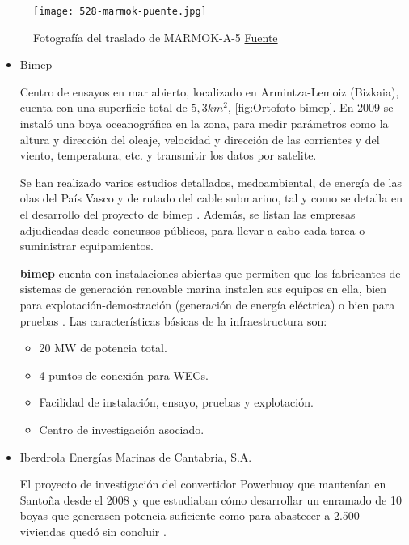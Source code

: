 \begin{figure}
\centering
\texttt{[image: 528-marmok-puente.jpg]}
\caption[Fotografía del traslado de MARMOK-A-5]{Fotografía del traslado de MARMOK-A-5 \href{https://www.tecnalia.com/es/energia-medioambiente/noticias/oceantec-instala-en-bimep-su-primer-dispositivo-para-el-aprovechamiento-de-la-energia-de-las-olas.htm}{Fuente}}
\label{fig:marmok-puente}
\end{figure}

\begin{itemize}
\item
  Bimep

  Centro de ensayos en mar abierto, localizado en Armintza-Lemoiz
  (Bizkaia), cuenta con una superficie total de \(5,3 km^2\), \autoref{fig:Ortofoto-bimep}. En 2009 se
  instaló una boya oceanográfica en la zona, para medir parámetros como
  la altura y dirección del oleaje, velocidad y dirección de las
  corrientes y del viento, temperatura, etc. y transmitir los datos por
  satelite.

  Se han realizado varios estudios detallados, medoambiental, de energía
  de las olas del País Vasco y de rutado del cable submarino, tal y como
  se detalla en el desarrollo del proyecto de bimep \cite{bimep07}. Además, se listan las empresas adjudicadas desde
  concursos públicos, para llevar a cabo cada tarea o suministrar
  equipamientos.

  \textbf{bimep} cuenta con instalaciones abiertas que permiten que los fabricantes de sistemas de generación
  renovable marina instalen sus equipos en ella, bien para
  explotación-demostración (generación de energía eléctrica) o bien para
  pruebas \cite{bimep07i}. Las características básicas de la infraestructura son:

  \begin{itemize}
  \item
    20 MW de potencia total.
  \item
    4 puntos de conexión para WECs.
  \item
    Facilidad de instalación, ensayo, pruebas y explotación.
  \item
    Centro de investigación asociado.
  \end{itemize}
\item
  Iberdrola Energías Marinas de Cantabria, S.A.

  El proyecto de investigación del convertidor Powerbuoy que mantenían
  en Santoña desde el 2008 y que estudiaban cómo desarrollar un enramado
  de 10 boyas que generasen potencia suficiente como para abastecer a
  2.500 viviendas quedó sin concluir \cite{santona13}.
    


\end{itemize}
